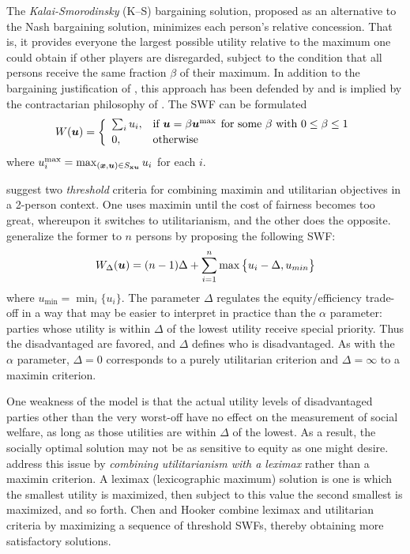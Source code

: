 \documentclass{article}[11pt]
\renewcommand{\vec}[1]{\mathbf{#1}}
\begin{document}
The {\em Kalai-Smorodinsky} (K--S) bargaining solution, proposed as an alternative to the Nash bargaining solution, minimizes each person's relative concession.  That is, it provides everyone the largest possible utility relative to the maximum one could obtain if other players are disregarded, subject to the condition that all persons receive the same fraction $\beta$ of their maximum.  In addition to the bargaining justification of \cite{KalSmo75}, this approach has been defended by \cite{Tho94} and is implied by the contractarian philosophy of \cite{Gau87}.  The SWF can be formulated 
\[
W(\bu) = \left\{
\begin{array}{ll}
\sum_i u_i, & \mbox{if $\bu=\beta\bu^{\max}$} \hspace{1ex} \mbox{for some $\beta$ with $0\leq\beta\leq 1$} \vspace{0.5ex} \\
0, & \mbox{otherwise}
\end{array}
\right.
\]
where $u_i^{\max} = \max_{(\vx,\vu) \in S_{\vec{x}\bu}} u_i$ for each $i$.  



\cite{WilliamsCookson2000} suggest two {\em threshold} criteria for combining maximin and utilitarian objectives in a \mbox{2-person} context.  One uses maximin until the cost of fairness becomes too great, whereupon it switches to utilitarianism, and the other does the opposite.  \cite{HooWil12} generalize the former to $n$ persons by proposing the following SWF:
\[
W_{\Delta}(\bm{u}) = (n-1)\Delta + \sum_{i=1}^n \max \big\{u_i-\Delta, u_{min}\big\} 
\]
where $u_{\min}=\min_i\{u_i\}$.  The parameter $\Delta$ regulates the equity/efficiency trade-off in a way that may be easier to interpret in practice than the $\alpha$ parameter: parties whose utility is within $\Delta$ of the lowest utility receive special priority.  Thus the disadvantaged are favored, and $\Delta$ defines who is disadvantaged.  As with the $\alpha$ parameter, $\Delta=0$ corresponds to a purely utilitarian criterion and $\Delta=\infty$ to a maximin criterion. 

One weakness of the model is that the actual utility levels of disadvantaged parties other than the very worst-off have no effect on the measurement of social welfare, as long as those utilities are within $\Delta$ of the lowest.  As a result, the socially optimal solution may not be as sensitive to equity as one might desire.  \cite{CheHoo20,CheHoo22a} address this issue by {\em combining utilitarianism with a leximax} rather than a maximin criterion.  A leximax (lexicographic maximum) solution is one is which the smallest utility is maximized, then subject to this value the second smallest is maximized, and so forth.  Chen and Hooker combine leximax and utilitarian criteria by maximizing a sequence of threshold SWFs, thereby obtaining more satisfactory solutions.  
\end{document}

